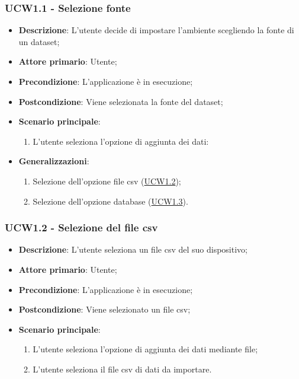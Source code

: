 \subsubsection{UCW1.1 - Selezione fonte}
\label{ssub:ucw1.1}
\begin{itemize}
    \item \textbf{Descrizione}: L'utente decide di impostare l'ambiente scegliendo la fonte di un dataset;

    \item \textbf{Attore primario}: Utente;
        
    \item \textbf{Precondizione}:   L'applicazione è in esecuzione;

    \item \textbf{Postcondizione}:  Viene selezionata la fonte del dataset;

	\item \textbf{Scenario principale}:
		\begin{enumerate}
			\item L'utente seleziona l'opzione di aggiunta dei dati:
        \end{enumerate}

        \item \textbf{Generalizzazioni}:
        \begin{enumerate}
            \item Selezione dell'opzione file csv (\hyperref[ssub:ucw1.2]{UCW1.2});
            \item Selezione dell'opzione database (\hyperref[ssub:ucw1.3]{UCW1.3}).
        \end{enumerate}
\end{itemize}


\subsubsection{UCW1.2 - Selezione del file csv}
\label{ssub:ucw1.2}
\begin{itemize}
    \item \textbf{Descrizione}: L'utente seleziona un file csv del suo dispositivo;

    \item \textbf{Attore primario}: Utente;
    
    \item \textbf{Precondizione}:   L'applicazione è in esecuzione;
    \item \textbf{Postcondizione}:  Viene selezionato un file csv;

	\item \textbf{Scenario principale}:
		\begin{enumerate}
			\item L'utente seleziona l'opzione di aggiunta dei dati mediante file;
			\item L'utente seleziona il file csv di dati da importare.
        \end{enumerate}
\end{itemize}

